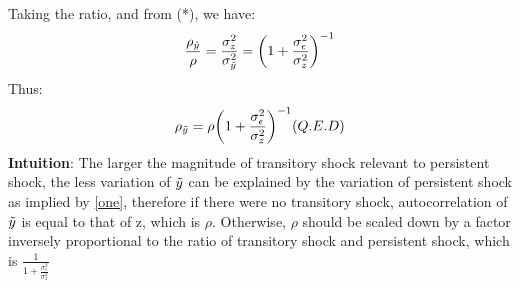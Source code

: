 \documentclass[12pt,a4paper]{article}
\begin{document}
Taking the ratio, and from (*), we have:
\begin{equation*}
  \frac{\rho_{\Tilde{y}}}{\rho}=\frac{\sigma^2_z}{\sigma^2_{\Tilde{y}}} =\bigg(1+\frac{\sigma^2_\epsilon}{\sigma^2_z}\bigg)^{-1}
\end{equation*}
Thus: 
\begin{equation*}
\rho_{\Tilde{y}}=\rho\bigg(1+\frac{\sigma^2_\epsilon}{\sigma^2_z}\bigg)^{-1}(Q.E.D)
\end{equation*} 
\textbf{Intuition}: The larger the magnitude of transitory shock relevant to persistent shock, the less variation of $\Tilde{y}$ can be explained by the variation of persistent shock as implied by \eqref{one}, therefore if there were no transitory shock, autocorrelation of $\Tilde{y}$ is equal to that of z, which is $\rho$. Otherwise, $\rho$ should be scaled down by a factor inversely proportional to the ratio of transitory shock and persistent shock, which is $\frac{1}{1+\frac{\sigma^2_\epsilon}{\sigma^2_z}}$\\
\end{document}
